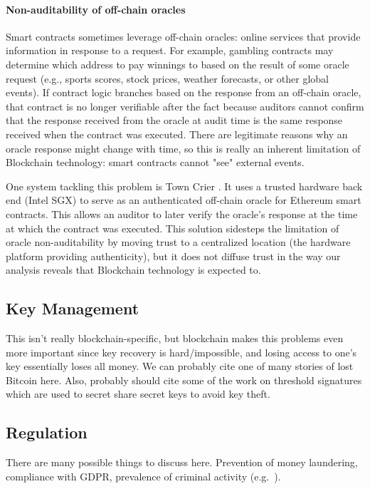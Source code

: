\paragraph{Non-auditability of off-chain oracles}
Smart contracts sometimes leverage off-chain oracles: online services that provide information in response to a request. For example, gambling contracts may determine which address to pay winnings to based on the result of some oracle request (e.g., sports scores, stock prices, weather forecasts, or other global events). If contract logic branches based on the response from an off-chain oracle, that contract is no longer verifiable after the fact because auditors cannot confirm that the response received from the oracle at audit time is the same response received when the contract was executed. There are legitimate reasons why an oracle response might change with time, so this is really an inherent limitation of Blockchain technology: smart contracts cannot "see" external events.

One system tackling this problem is Town Crier \cite{Zhang16}. It uses a trusted hardware back end (Intel SGX) to serve as an authenticated off-chain oracle for Ethereum smart contracts. This allows an auditor to later verify the oracle's response at the time at which the contract was executed. This solution sidesteps the limitation of oracle non-auditability by moving trust to a centralized location (the hardware platform providing authenticity), but it does not diffuse trust in the way our analysis reveals that Blockchain technology is expected to.

\subsection{Key Management}
This isn't really blockchain-specific, but blockchain makes this problems even more important since key recovery is hard/impossible, and losing access to one's key essentially loses all money.  We can probably cite one of many stories of lost Bitcoin here.  Also, probably should cite some of the work on threshold signatures which are used to secret share secret keys to avoid key theft.

\subsection{Regulation}
There are many possible things to discuss here.  Prevention of money laundering, compliance with GDPR, prevalence of criminal activity (e.g.~\cite{CCS:JueKosShi16}).


